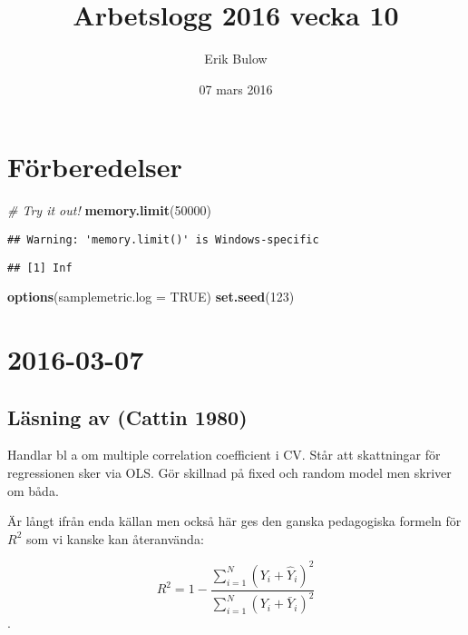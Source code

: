 \documentclass[]{article}
\title{Arbetslogg 2016 vecka 10}
\author{Erik Bulow}
\date{07 mars 2016}
\newenvironment{Shaded}{\begin{snugshade}}{\end{snugshade}}
\newcommand{\KeywordTok}[1]{\textcolor[rgb]{0.13,0.29,0.53}{\textbf{{#1}}}}
\newcommand{\DataTypeTok}[1]{\textcolor[rgb]{0.13,0.29,0.53}{{#1}}}
\newcommand{\DecValTok}[1]{\textcolor[rgb]{0.00,0.00,0.81}{{#1}}}
\newcommand{\CommentTok}[1]{\textcolor[rgb]{0.56,0.35,0.01}{\textit{{#1}}}}
\newcommand{\OtherTok}[1]{\textcolor[rgb]{0.56,0.35,0.01}{{#1}}}
\newcommand{\NormalTok}[1]{{#1}}
\begin{document}
\maketitle

{
\setcounter{tocdepth}{2}
\tableofcontents
}
\section{Förberedelser}\label{forberedelser}

\begin{Shaded}
\begin{Highlighting}[]
\CommentTok{# Try it out!}
\KeywordTok{memory.limit}\NormalTok{(}\DecValTok{50000}\NormalTok{)}
\end{Highlighting}
\end{Shaded}

\begin{verbatim}
## Warning: 'memory.limit()' is Windows-specific
\end{verbatim}

\begin{verbatim}
## [1] Inf
\end{verbatim}

\begin{Shaded}
\begin{Highlighting}[]
\KeywordTok{options}\NormalTok{(}\DataTypeTok{samplemetric.log =} \OtherTok{TRUE}\NormalTok{)}
\KeywordTok{set.seed}\NormalTok{(}\DecValTok{123}\NormalTok{)}
\end{Highlighting}
\end{Shaded}

\section{2016-03-07}\label{section}

\subsection{Läsning av (Cattin 1980)}\label{lasning-av-cattin1980}

Handlar bl a om multiple correlation coefficient i CV. Står att
skattningar för regressionen sker via OLS. Gör skillnad på fixed och
random model men skriver om båda.

Är långt ifrån enda källan men också här ges den ganska pedagogiska
formeln för \(R^2\) som vi kanske kan återanvända:

\[R^2 = 1 - \frac{\sum_{i = 1}^N (Y_i + \hat{Y}_i)^2}{\sum_{i = 1}^N (Y_i + \bar{Y}_i)^2}\].
\end{document}
